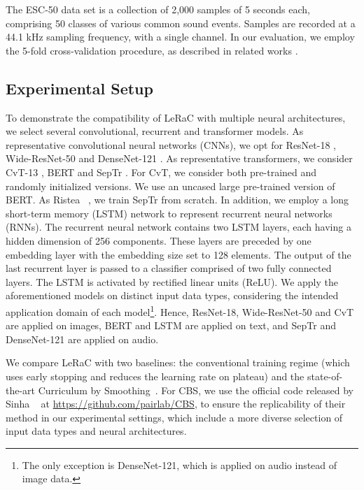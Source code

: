 \documentclass[10pt,twocolumn,letterpaper]{article}
\begin{document}
The ESC-50 \cite{Piczak-ACMMM-2015} data set is a collection of 2,000 samples of 5 seconds each, comprising 50 classes of various common sound events. Samples are recorded at a 44.1 kHz sampling frequency, with a single channel. In our evaluation, we employ the 5-fold cross-validation procedure, as described in related works \cite{Piczak-ACMMM-2015,Ristea-ARXIV-2022}.

\vspace{-0.1cm}
\subsection{Experimental Setup}
\vspace{-0.1cm}

 To demonstrate the compatibility of LeRaC with multiple neural architectures, we select several convolutional, recurrent and transformer models. As representative convolutional neural networks (CNNs), we opt for ResNet-18 \cite{He-CVPR-2016}, Wide-ResNet-50 \cite{Zagoruyko-ArXiv-2016wide} and DenseNet-121 \cite{Gao-CVPR-2017}. As representative transformers, we consider CvT-13 \cite{Wu-ICCV-2021}, BERT \cite{Devlin-NAACL-2019} and SepTr \cite{Ristea-ARXIV-2022}. For CvT, we consider both pre-trained and randomly initialized versions. We use an uncased large pre-trained version of BERT. As Ristea \etal~\cite{Ristea-ARXIV-2022}, we train SepTr from scratch.
In addition, we employ a long short-term memory (LSTM) network \cite{Hochreiter-NC-1997} to represent recurrent neural networks (RNNs). The recurrent neural network contains two LSTM layers, each having a hidden dimension of 256 components. These layers are preceded by one embedding layer with the embedding size set to 128 elements. The output of the last recurrent layer is passed to a classifier comprised of two fully connected layers. The LSTM is activated by rectified linear units (ReLU). 
We apply the aforementioned models on distinct input data types, considering the intended application domain of each model\footnote{The only exception is DenseNet-121, which is applied on audio instead of image data.}. Hence, ResNet-18, Wide-ResNet-50 and CvT are applied on images, BERT and LSTM are applied on text, and SepTr and DenseNet-121 are applied on audio.

We compare LeRaC with two baselines: the conventional training regime (which uses early stopping and reduces the learning rate on plateau) and the state-of-the-art Curriculum by Smoothing~\cite{Sinha-NIPS-2020}. For CBS, we use the official code released by Sinha \etal~\cite{Sinha-NIPS-2020} at \url{https://github.com/pairlab/CBS}, to ensure the replicability of their method in our experimental settings, which include a more diverse selection of input data types and neural architectures.
\end{document}
